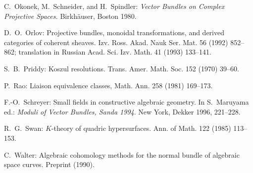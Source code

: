 \documentclass{tran-l}
\theoremstyle{plain}
\theoremstyle{remark}
\theoremstyle{definition}
\begin{document}
\begin{thebibliography}{EPSW}
C.~Okonek, M.~Schneider, and H.~Spindler: {\sl Vector Bundles on
Complex Projective Spaces.\/} Birkh\"{a}user, Boston 1980.

D.~O.~Orlov:
Projective bundles, monoidal transformations,
and derived categories of coherent sheaves. Izv. Ross. Akad. Nauk
Ser. Mat. 56 (1992) 852--862; translation in Russian Acad. Sci. Izv. Math.
41 (1993) 133--141.

S.~B.~Priddy: Koszul resolutions. Trans. Amer. Math. Soc. 152
(1970) 39--60.

P.~Rao: Liaison equivalence classes, Math. Ann. 258 (1981) 169--173.

F.-O.~Schreyer: Small fields in constructive algebraic geometry.
In S.~Maruyama ed.: {\sl Moduli of Vector Bundles, Sanda 1994}. New York, Dekker 1996,
221--228.

R.~G.~Swan: $K$-theory of quadric hypersurfaces. Ann. of Math.
122 (1985) 113--153.

C.~Walter: Algebraic cohomology methods for the normal bundle of algebraic space curves.
Preprint (1990).

\end{thebibliography}
\end{document}
